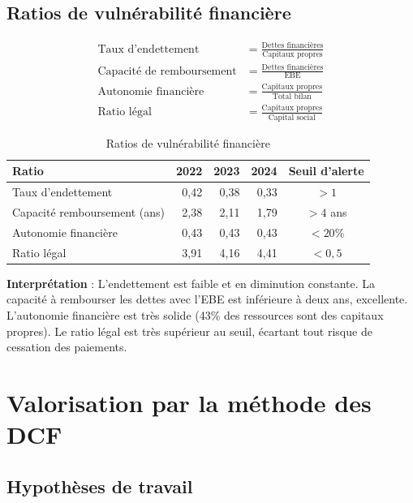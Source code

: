 \documentclass{rapportECL}
\begin{document}
\subsection{Ratios de vulnérabilité financière}

\begin{align*}
\text{Taux d'endettement}      &= \frac{\text{Dettes financières}}{\text{Capitaux propres}} \\
\text{Capacité de remboursement} &= \frac{\text{Dettes financières}}{\text{EBE}} \\
\text{Autonomie financière}    &= \frac{\text{Capitaux propres}}{\text{Total bilan}} \\
\text{Ratio légal}            &= \frac{\text{Capitaux propres}}{\text{Capital social}}
\end{align*}

\begin{table}[H]
\centering
\caption{Ratios de vulnérabilité financière}
\label{tab:vulnerabilite}
\begin{tabular}{l r r r c}
\toprule
\textbf{Ratio} & \textbf{2022} & \textbf{2023} & \textbf{2024} & \textbf{Seuil d'alerte} \\
\midrule
Taux d'endettement         & 0,42 & 0,38 & 0,33 & $>1$ \\
Capacité remboursement (ans) & 2,38 & 2,11 & 1,79 & $>4$ ans \\
Autonomie financière       & 0,43 & 0,43 & 0,43 & $<20\%$ \\
Ratio légal                & 3,91 & 4,16 & 4,41 & $<0,5$ \\
\bottomrule
\end{tabular}
\end{table}

\textbf{Interprétation} : L'endettement est faible et en diminution constante. La capacité à rembourser les dettes avec l'EBE est inférieure à deux ans, excellente. L'autonomie financière est très solide (43\% des ressources sont des capitaux propres). Le ratio légal est très supérieur au seuil, écartant tout risque de cessation des paiements.

\section{Valorisation par la méthode des DCF}

\subsection{Hypothèses de travail}
\end{document}
